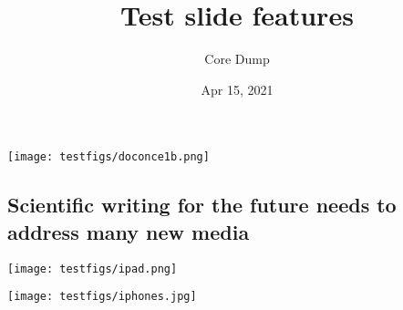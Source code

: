 \documentclass[%
oneside,                 %
final,                   %
10pt]{article}
\newcounter{doconce:movie:counter}
\begin{document}

\newcommand{\exercisesection}[1]{\subsection*{#1}}








\title{Test slide features}


\author{Core Dump}

\date{Apr 15, 2021
}

\vspace{6mm}

\centerline{\texttt{[image: testfigs/doconce1b.png]}}

\vspace{6mm}


\subsection{Scientific writing for the future needs to address many new media}


\vspace{6mm}

\centerline{\texttt{[image: testfigs/ipad.png]}}

\vspace{6mm}

\vspace{6mm}

\centerline{\texttt{[image: testfigs/iphones.jpg]}}

\vspace{6mm}


\end{document}
